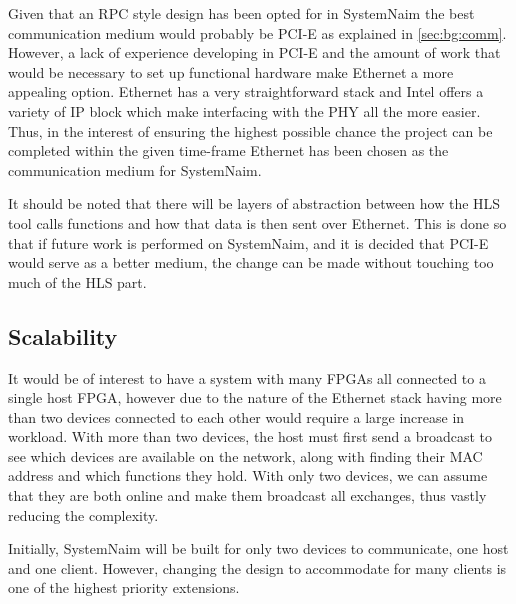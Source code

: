 Given that an RPC style design has been opted for in SystemNaim the best communication medium would probably be PCI-E as explained in \autoref{sec:bg:comm}. However, a lack of experience developing in PCI-E and the amount of work that would be necessary to set up functional hardware make Ethernet a more appealing option. Ethernet has a very straightforward stack and Intel offers a variety of IP block which make interfacing with the PHY all the more easier. Thus, in the interest of ensuring the highest possible chance the project can be completed within the given time-frame Ethernet has been chosen as the communication medium for SystemNaim.

It should be noted that there will be layers of abstraction between how the HLS tool calls functions and how that data is then sent over Ethernet. This is done so that if future work is performed on SystemNaim, and it is decided that PCI-E would serve as a better medium, the change can be made without touching too much of the HLS part.

\subsection{Scalability}

It would be of interest to have a system with many FPGAs all connected to a single host FPGA, however due to the nature of the Ethernet stack having more than two devices connected to each other would require a large increase in workload. With more than two devices, the host must first send a broadcast to see which devices are available on the network, along with finding their MAC address and which functions they hold. With only two devices, we can assume that they are both online and make them broadcast all exchanges, thus vastly reducing the complexity. 

Initially, SystemNaim will be built for only two devices to communicate, one host and one client. However, changing the design to accommodate for many clients is one of the highest priority extensions.


